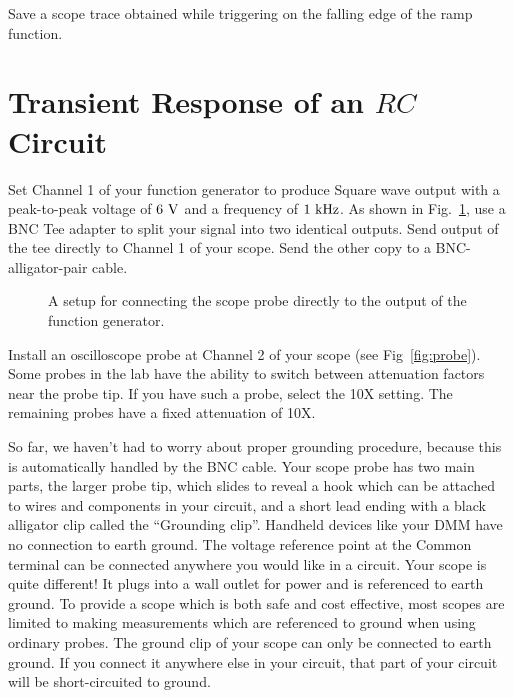 \begin{plot}
Save a scope trace obtained while triggering on the falling edge of the ramp function.
\end{plot}

\section{Transient Response of an $RC$ Circuit}

Set Channel 1 of your function generator to produce Square wave output
with a peak-to-peak voltage of $6~\rm V$ and a frequency of $1~\rm
kHz$.  As shown in Fig.~\ref{fig:probe_setup}, use a BNC Tee adapter
to split your signal into two identical outputs.  Send output of the
tee directly to Channel 1 of your scope.  Send the other copy to a
BNC-alligator-pair cable.

\begin{figure}[htbp]
\begin{center}
\caption{A setup for connecting the scope probe directly to the output of the function generator.}
\label{fig:probe_setup}
\end{center}
\end{figure}

Install an oscilloscope probe at Channel 2 of your scope (see
Fig~\ref{fig:probe}).  Some probes in the lab have the ability to
switch between attenuation factors near the probe tip.  If you have
such a probe, select the 10X setting.  The remaining probes have a
fixed attenuation of 10X.

So far, we haven't had to worry about proper grounding procedure,
because this is automatically handled by the BNC cable.  Your scope
probe has two main parts, the larger probe tip, which slides to reveal
a hook which can be attached to wires and components in your circuit,
and a short lead ending with a black alligator clip called the
``Grounding clip''.  Handheld devices like your DMM have no connection
to earth ground.  The voltage reference point at the Common terminal
can be connected anywhere you would like in a circuit.  Your scope is
quite different!  It plugs into a wall outlet for power and is
referenced to earth ground.  To provide a scope which is both safe and
cost effective, most scopes are limited to making measurements which
are referenced to ground when using ordinary probes.  The ground clip
of your scope can only be connected to earth ground.  If you connect
it anywhere else in your circuit, that part of your circuit will be
short-circuited to ground.

